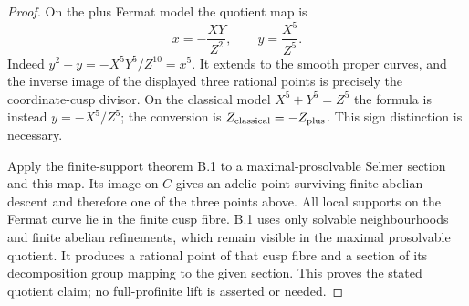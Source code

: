 \begin{proof}
On the plus Fermat model the quotient map is
\[
  x=-\frac{XY}{Z^2},\qquad y=\frac{X^5}{Z^5}.
\]
Indeed $y^2+y=-X^5Y^5/Z^{10}=x^5$. It extends to the smooth proper
curves, and the inverse image of the displayed three rational points
is precisely the coordinate-cusp divisor. On the classical model
$X^5+Y^5=Z^5$ the formula is instead
$y=-X^5/Z^5$; the conversion is $Z_{\rm classical}=-Z_{\rm plus}$.
This sign distinction is necessary.

Apply the finite-support theorem B.1 to a maximal-prosolvable Selmer
section and this map. Its image on $C$ gives an adelic point surviving
finite abelian descent and therefore one of the three points above.
All local supports on the Fermat curve lie in the finite cusp fibre.
B.1 uses only solvable neighbourhoods and finite abelian refinements,
which remain visible in the maximal prosolvable quotient. It produces
a rational point of that cusp fibre and a section of its decomposition
group mapping to the given section. This proves the stated quotient
claim; no full-profinite lift is asserted or needed.
\end{proof}

